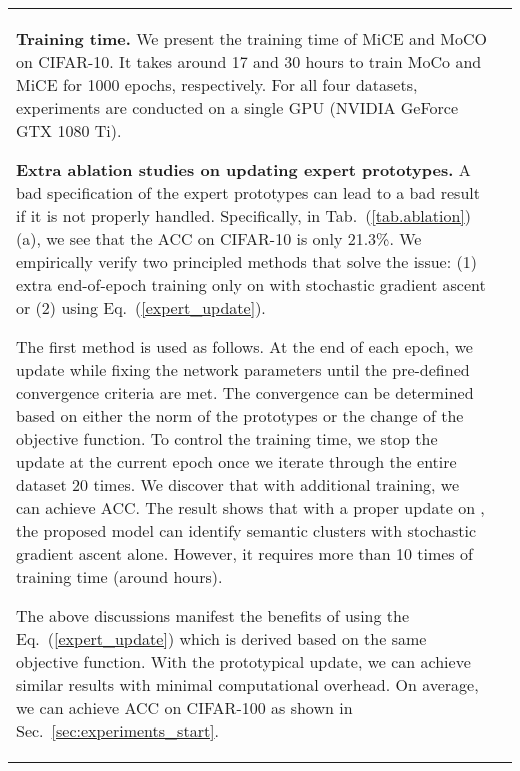 \documentclass{article} \usepackage{iclr2021_conference,times}
\begin{document}
\begin{table}[t]
\begin{subtable}[h]{0.49\textwidth}
{\begin{tabular}{@{}lc@{}}
{\bf Training time.} We present the training time of MiCE and MoCO on CIFAR-10.  It takes around 17 and 30 hours to train MoCo and MiCE for 1000 epochs, respectively. For all four datasets, experiments are conducted on a single GPU (NVIDIA GeForce GTX 1080 Ti).







{\bf Extra ablation studies on updating expert prototypes.} A bad specification of the expert prototypes can lead to a bad result if it is not properly handled. Specifically, in Tab.~(\ref{tab.ablation}) (a), we see that the ACC on CIFAR-10 is only 21.3\%. We empirically verify two principled methods that solve the issue: (1) extra end-of-epoch training only on  with stochastic gradient ascent or (2) using Eq.~(\ref{expert_update}).


The first method is used as follows. At the end of each epoch, we update  while fixing the network parameters until the pre-defined convergence criteria are met. The convergence can be determined based on either the norm of the prototypes or the change of the objective function. 
To control the training time, we stop the update at the current epoch once we iterate through the entire dataset 20 times. We discover that with additional training, we can achieve  ACC. The result shows that with a proper update on , the proposed model can identify semantic clusters with stochastic gradient ascent alone. 
However, it requires more than 10 times of training time (around  hours).

The above discussions manifest the benefits of using the Eq.~(\ref{expert_update}) which is derived based on the same objective function. With the prototypical update, we can achieve similar results with minimal computational overhead. On average, we can achieve  ACC on CIFAR-100 as shown in Sec.~\ref{sec:experiments_start}. 







\end{tabular}}
\end{subtable}
\end{table}
\end{document}
